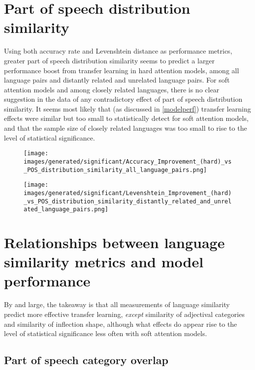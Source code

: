 \newpage

\section{Part of speech distribution similarity}

Using both accuracy rate and Levenshtein distance as performance metrics, greater part of speech distribution similarity seems to predict a larger performance boost from transfer learning in hard attention models, among all language pairs and distantly related and unrelated language pairs. For soft attention models and among closely related languages, there is no clear suggestion in the data of any contradictory effect of part of speech distribution similarity. It seems most likely that (as discussed in \ref{modelperf}) transfer learning effects were similar but too small to statistically detect for soft attention models, and that the sample size of closely related languages was too small to rise to the level of statistical significance. 

\begin{figure}[ht]
\texttt{[image: images/generated/significant/Accuracy\_Improvement\_(hard)\_vs\_POS\_distribution\_similarity\_all\_language\_pairs.png]}
\centering
\caption{}
\end{figure}

\begin{figure}[ht]
\texttt{[image: images/generated/significant/Levenshtein\_Improvement\_(hard)\_vs\_POS\_distribution\_similarity\_distantly\_related\_and\_unrelated\_language\_pairs.png]}
\centering
\caption{}
\end{figure}

\section{Relationships between language similarity metrics and model performance}

By and large, the takeaway is that all measurements of language similarity predict more effective transfer learning, \textit{except} similarity of adjectival categories and similarity of inflection shape, although what effects do appear rise to the level of statistical significance less often with soft attention models.

\subsection{Part of speech category overlap}

